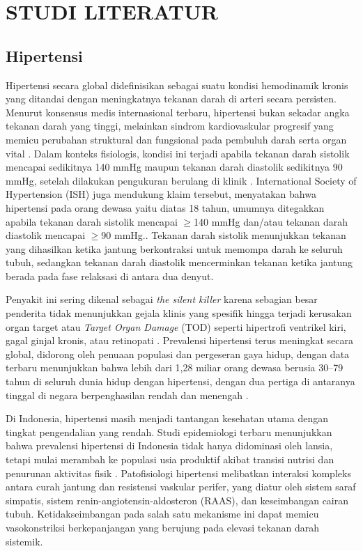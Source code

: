 \cleardoublepage %
\chapter{STUDI LITERATUR}
\label{chap:studi-literatur}

\section{Hipertensi}
Hipertensi secara global didefinisikan sebagai suatu kondisi hemodinamik kronis yang ditandai dengan meningkatnya tekanan darah di arteri secara persisten. Menurut konsensus medis internasional terbaru, hipertensi bukan sekadar angka tekanan darah yang tinggi, melainkan sindrom kardiovaskular progresif yang memicu perubahan struktural dan fungsional pada pembuluh darah serta organ vital \autocite{Reges2020Association}. Dalam konteks fisiologis, kondisi ini terjadi apabila tekanan darah sistolik mencapai sedikitnya 140 mmHg maupun tekanan darah diastolik sedikitnya 90 mmHg, setelah dilakukan pengukuran berulang di klinik \autocite{Reges2020Association}. International Society of Hypertension (ISH) juga mendukung klaim tersebut, menyatakan bahwa hipertensi pada orang dewasa yaitu diatas 18 tahun, umumnya ditegakkan apabila tekanan darah sistolik mencapai $\geq$140 mmHg dan/atau tekanan darah diastolik mencapai $\geq$90 mmHg.\autocite{Unger2020}. Tekanan darah sistolik menunjukkan tekanan yang dihasilkan ketika jantung berkontraksi untuk memompa darah ke seluruh tubuh, sedangkan tekanan darah diastolik mencerminkan tekanan ketika jantung berada pada fase relaksasi di antara dua denyut.\autocite{Whelton2018Guideline}


Penyakit ini sering dikenal sebagai \emph{the silent killer} karena sebagian besar penderita tidak menunjukkan gejala klinis yang spesifik hingga terjadi kerusakan organ target atau \emph{Target Organ Damage} (TOD) seperti hipertrofi ventrikel kiri, gagal ginjal kronis, atau retinopati \autocite{Mills2020Global}. Prevalensi hipertensi terus meningkat secara global, didorong oleh penuaan populasi dan pergeseran gaya hidup, dengan data terbaru menunjukkan bahwa lebih dari 1,28 miliar orang dewasa berusia 30--79 tahun di seluruh dunia hidup dengan hipertensi, dengan dua pertiga di antaranya tinggal di negara berpenghasilan rendah dan menengah \autocite{WHO2023}.

Di Indonesia, hipertensi masih menjadi tantangan kesehatan utama dengan tingkat pengendalian yang rendah. Studi epidemiologi terbaru menunjukkan bahwa prevalensi hipertensi di Indonesia tidak hanya didominasi oleh lansia, tetapi mulai merambah ke populasi usia produktif akibat transisi nutrisi dan penurunan aktivitas fisik \autocite{manongga2024gambaran}. Patofisiologi hipertensi melibatkan interaksi kompleks antara curah jantung dan resistensi vaskular perifer, yang diatur oleh sistem saraf simpatis, sistem renin-angiotensin-aldosteron (RAAS), dan keseimbangan cairan tubuh. Ketidakseimbangan pada salah satu mekanisme ini dapat memicu vasokonstriksi berkepanjangan yang berujung pada elevasi tekanan darah sistemik.


